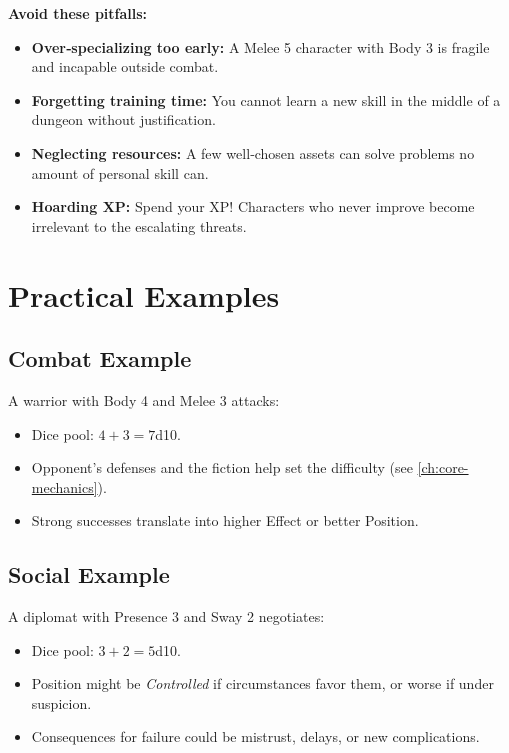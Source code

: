 \begin{tcolorbox}[colback=orange!5!white, colframe=orange!75!black, title=Common Advancement Mistakes]
\noindent\textbf{Avoid these pitfalls:}
\begin{itemize}
  \item \textbf{Over‑specializing too early:} A Melee 5 character with Body 3 is fragile and incapable outside combat.
  \item \textbf{Forgetting training time:} You cannot learn a new skill in the middle of a dungeon without justification.
  \item \textbf{Neglecting resources:} A few well‑chosen assets can solve problems no amount of personal skill can.
  \item \textbf{Hoarding XP:} Spend your XP! Characters who never improve become irrelevant to the escalating threats.
\end{itemize}
\end{tcolorbox}

\section{Practical Examples}
\label{sec:practical-examples}

\subsection{Combat Example}
\label{sec:combat-example}
A warrior with Body 4 and Melee 3 attacks:
\begin{itemize}
  \item Dice pool: $4 + 3 = 7$d10.
  \item Opponent's defenses and the fiction help set the difficulty (see \ref{ch:core-mechanics}).
  \item Strong successes translate into higher Effect or better Position.
\end{itemize}

\subsection{Social Example}
\label{sec:social-example}
A diplomat with Presence 3 and Sway 2 negotiates:
\begin{itemize}
  \item Dice pool: $3 + 2 = 5$d10.
  \item Position might be \emph{Controlled} if circumstances favor them, or worse if under suspicion.
  \item Consequences for failure could be mistrust, delays, or new complications.
\end{itemize}

